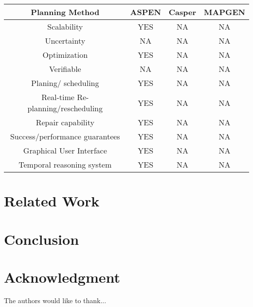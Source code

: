 \documentclass[conference]{IEEEtran}
\begin{document}
\begin{center}
\begin {tabular}{ c|c|c|c }
 \hline
 \hline
Planning Method & ASPEN & Casper &MAPGEN\\
 \hline
Scalability   &YES   &NA   &NA\\
Uncertainty   &NA    &NA   &NA\\
Optimization   &YES    &NA   &NA\\
Verifiable    &NA &NA &NA\\
Planing/ scheduling &YES  &NA   &NA\\
Real-time Re-planning/rescheduling &YES    &NA   &NA\\
Repair capability &YES    &NA   &NA\\
Success/performance guarantees &YES &NA &NA\\
Graphical User Interface &YES  &NA &NA\\
Temporal reasoning system  &YES &NA &NA \\
 \hline
\end{tabular}
\end{center}


\section{Related Work}

\section{Conclusion}


\section*{Acknowledgment}
The authors would like to thank...
\end{document}
